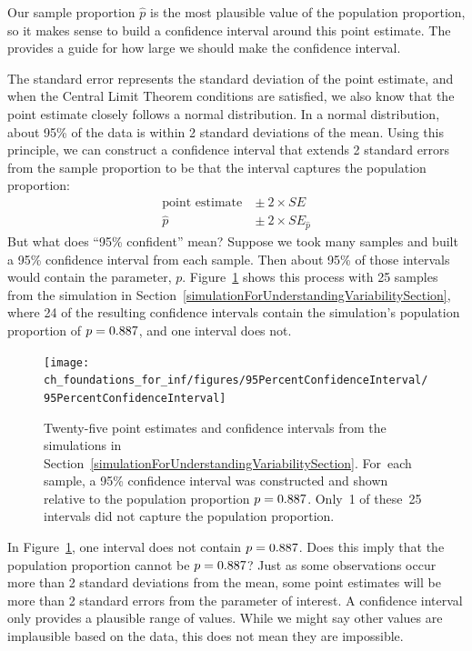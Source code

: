 Our sample proportion $\hat{p}$ is the most plausible
value of the population proportion, so it makes sense
to build a confidence interval around this point estimate.
The  provides a guide for how
large we should make the confidence interval.

The standard error represents the standard deviation
of the point estimate, and when the Central
Limit Theorem conditions are satisfied, we also know
that the point estimate closely follows a normal
distribution. In a normal distribution, about 95\% of
the data is within 2 standard deviations of the mean.
Using this principle, we can construct a confidence
interval that extends 2 standard errors from the sample
proportion to be 
that the interval captures the population proportion:
\begin{align*}
\text{point estimate}\ &\pm\ 2\times SE \\
\hat{p}\ &\pm\ 2\times SE_{\hat{p}}
\end{align*}
But what does ``95\% confident'' mean? Suppose we took
many samples and built a 95\% confidence interval from
each sample. Then about 95\% of those intervals would
contain the parameter, $p$.
Figure~\ref{95PercentConfidenceInterval} shows this
process with 25 samples from the simulation in
Section~\ref{simulationForUnderstandingVariabilitySection},
where 24 of the resulting confidence intervals contain
the simulation's population proportion of
$p = 0.887{}$, and one interval does not.

\begin{figure}
   \centering
   \texttt{[image: ch\_foundations\_for\_inf/figures/95PercentConfidenceInterval/95PercentConfidenceInterval]}
   \caption{Twenty-five point estimates and confidence
       intervals from the simulations in
       Section~\ref{simulationForUnderstandingVariabilitySection}.
       For~each sample, a 95\% confidence interval was
       constructed and shown relative to the population
       proportion $p = 0.887{}$. Only~1 of these~25
       intervals did not capture the population
       proportion.}
   \label{95PercentConfidenceInterval}
\end{figure}

\begin{example}{In Figure~\ref{95PercentConfidenceInterval},
one interval does not contain $p = 0.887{}$.
Does this imply that the population proportion cannot be
$p = 0.887{}$?}
Just as some observations occur more than 2 standard deviations
from the mean, some point estimates will be more than
2 standard errors from the parameter of interest.
A confidence interval only provides a plausible range
of values. While we might say other values are implausible
based on the data, this does not mean they are impossible.
\end{example}

